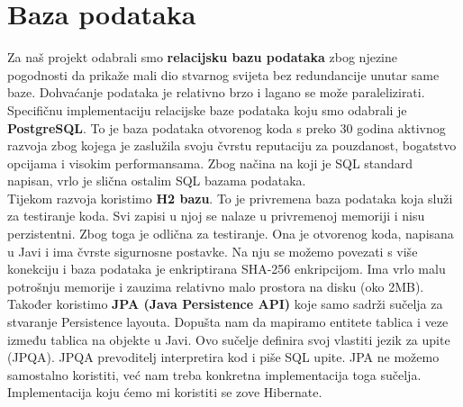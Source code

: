 		\section{Baza podataka}
			
		Za naš projekt odabrali smo \textbf{relacijsku bazu podataka} zbog njezine pogodnosti da prikaže mali dio stvarnog svijeta bez redundancije unutar same baze. Dohvaćanje podataka je relativno brzo i lagano se može paralelizirati. Specifičnu implementaciju relacijske baze podataka koju smo odabrali je \textbf{PostgreSQL}. To je baza podataka otvorenog koda s preko 30 godina aktivnog razvoja zbog kojega je zaslužila svoju čvrstu reputaciju za pouzdanost, bogatstvo opcijama i visokim performansama. Zbog načina na koji je SQL standard napisan, vrlo je slična ostalim SQL bazama podataka.\\ 
		
		Tijekom razvoja koristimo \textbf{H2 bazu}. To je privremena baza podataka koja služi za testiranje koda. Svi zapisi u njoj se nalaze u privremenoj memoriji i nisu perzistentni. Zbog toga je odlična za testiranje. Ona je otvorenog koda, napisana u Javi i ima čvrste sigurnosne postavke. Na nju se možemo povezati s više konekciju i baza podataka je enkriptirana SHA-256 enkripcijom. Ima vrlo malu potrošnju memorije i zauzima relativno malo prostora na disku (oko 2MB). \\ 
		
		Također koristimo \textbf{JPA (Java Persistence API)} koje samo sadrži sučelja za stvaranje Persistence layouta. Dopušta nam da mapiramo entitete tablica i veze između tablica na objekte u Javi. Ovo sučelje definira svoj vlastiti jezik za upite (JPQA). JPQA prevoditelj interpretira kod i piše SQL upite. JPA ne možemo samostalno koristiti, već nam treba konkretna implementacija toga sučelja. Implementacija koju ćemo mi koristiti se zove Hibernate. \\ 
		
